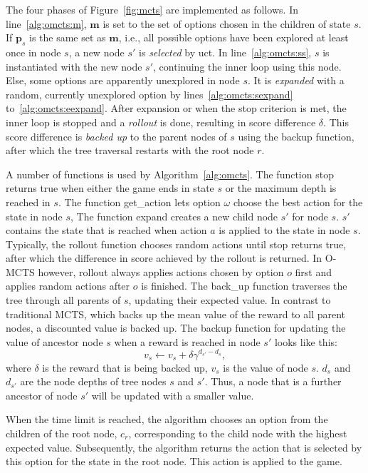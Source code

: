 The four phases of Figure~\ref{fig:mcts} are implemented as follows.  In 
line~\ref{alg:omcts:m}, $\mathbf{m}$ is set to the set of options chosen in the
children of state $s$. If $\mathbf{p}_s$ is the same set as $\mathbf{m}$, i.e.,
all possible options have been explored at least once in node $s$, a new node
$s'$ is \emph{selected} by \textsf{uct}. In line~\ref{alg:omcts:ss}, $s$ is
instantiated with the new node $s'$, continuing the inner loop using this node.
Else, some options are apparently unexplored in node $s$. It is \emph{expanded}
with a random, currently unexplored option by lines~\ref{alg:omcts:sexpand}
to~\ref{alg:omcts:eexpand}. After expansion or when the stop criterion is met,
the inner loop is stopped and a \emph{rollout} is done, resulting in
score difference $\delta$. This score difference is \emph{backed up} to the
parent nodes of $s$ using the backup function, after which the tree traversal
restarts with the root node $r$.

A number of functions is used by Algorithm~\ref{alg:omcts}. The function
\textsf{stop} returns true when either the game ends in state $s$ or the maximum
depth is reached in $s$. The function \textsf{get\_action} lets option $\omega$
choose the best action for the state in node $s$, The function \textsf{expand}
creates a new child node $s'$ for node $s$. $s'$ contains the state that is
reached when action $a$ is applied to the state in node $s$. Typically, the
\textsf{rollout} function chooses random actions until \textsf{stop} returns
true, after which the difference in score achieved by the rollout is returned.
In O-MCTS however, \textsf{rollout} always applies actions chosen by option $o$
first and applies random actions after $o$ is finished. The \textsf{back\_up}
function traverses the tree through all parents of $s$, updating their expected
value. In contrast to traditional MCTS, which backs up the mean value of the
reward to all parent nodes, a discounted value is backed up. The backup function
for updating the value of ancestor node $s$ when a reward is reached in node $s'$
looks like this:
\begin{equation}
	\label{eq:backup}
	v_s \gets v_s + \delta\gamma^{d_{s'}-d_{s}},
\end{equation}
where $\delta$ is the reward that is being backed up, $v_s$ is the value of node
$s$. $d_s$ and $d_{s'}$ are the node depths of tree nodes $s$ and $s'$. Thus, a
node that is a further ancestor of node $s'$ will be updated with a smaller
value.

When the time limit is reached, the algorithm chooses an option from the
children of the root node, $c_r$, corresponding to the child node with the
highest expected value. Subsequently, the algorithm returns the action that is
selected by this option for the state in the root node. This action is applied
to the game.

